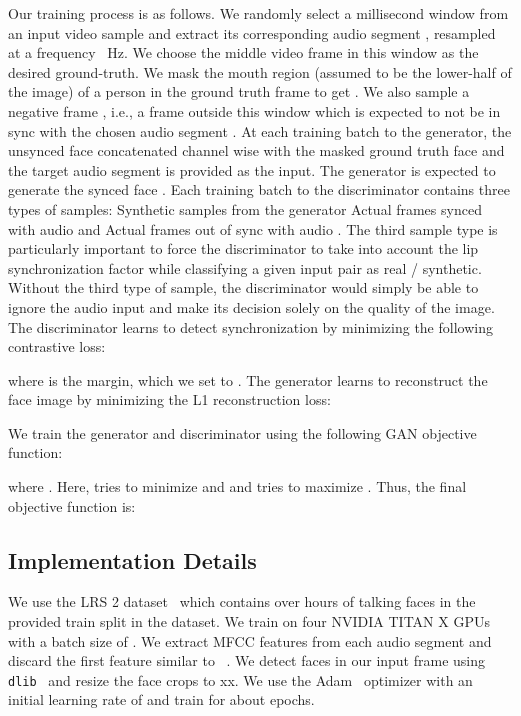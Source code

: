 \documentclass[sigconf]{acmart}
\begin{document}
Our training process is as follows. We randomly select a  millisecond window from an input video sample and extract its corresponding audio segment , resampled at a frequency ~Hz. We choose the middle video frame  in this window as the desired ground-truth. We mask the mouth region (assumed to be the lower-half of the image) of a person in the ground truth frame to get . We also sample a negative frame , i.e., a frame outside this window which is expected to not be in sync with the chosen audio segment . At each training batch to the generator, the unsynced face  concatenated channel wise with the masked ground truth face  and the target audio segment  is provided as the input. The generator is expected to generate the synced face . Each training batch to the discriminator contains three types of samples:  Synthetic samples from the generator  Actual frames synced with audio  and  Actual frames out of sync with audio . The third sample type is particularly important to force the discriminator to take into account the lip synchronization factor while classifying a given input pair as real / synthetic. Without the third type of sample, the discriminator would simply be able to ignore the audio input and make its decision solely on the quality of the image. The discriminator learns to detect synchronization by minimizing the following contrastive loss: 

where  is the margin, which we set to . The generator learns to reconstruct the face image by minimizing the L1 reconstruction loss:

We train the generator  and discriminator  using the following GAN objective function:





where . Here,  tries to minimize  and  and  tries to maximize . Thus, the final objective function is:


\subsection{Implementation Details} We use the LRS 2 dataset~\cite{afouras2018deep} which contains over  hours of talking faces in the provided train split in the dataset. We train on four NVIDIA TITAN X GPUs with a batch size of . We extract  MFCC features from each audio segment  and discard the first feature similar to ~\citet{chung2017you}. We detect faces in our input frame using \texttt{dlib}~\cite{king2009dlib} and resize the face crops to xx. We use the Adam~\cite{kingma2014adam} optimizer with an initial learning rate of  and train for about  epochs.
\end{document}
